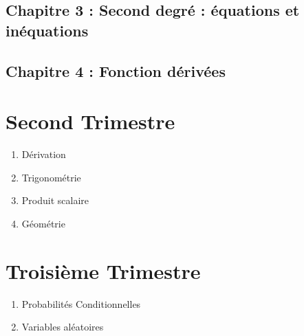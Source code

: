 \documentclass{article}
\begin{document}
\subsection*{Chapitre 3 : Second degré : équations et inéquations}
\subsection*{Chapitre 4 : Fonction dérivées}
\section{Second Trimestre}
\begin{enumerate}[resume]
\item Dérivation
\item Trigonométrie
\item Produit scalaire
\item Géométrie
\end{enumerate}
\section{Troisième Trimestre}
\begin{enumerate}[resume]
\item Probabilités Conditionnelles
\item Variables aléatoires
\end{enumerate}
\end{document}
